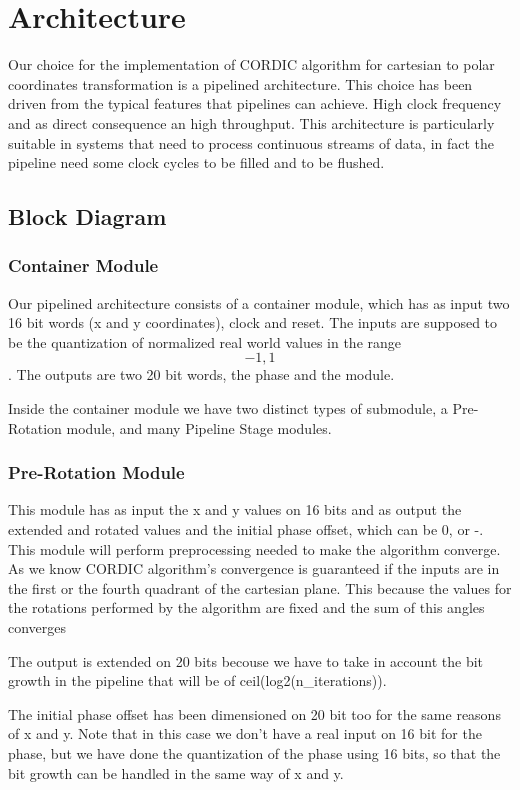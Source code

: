 \section{Architecture}
Our choice for the implementation of CORDIC algorithm for cartesian to polar
coordinates transformation is a pipelined architecture. This choice has been
driven from the typical features that pipelines can achieve. High clock
frequency and as direct consequence an high throughput. This architecture is
particularly suitable in systems that need to process continuous streams of
data, in fact the pipeline need some clock cycles to be filled and to be
flushed.

\subsection{Block Diagram}
\subsubsection{Container Module}
Our pipelined architecture consists of a container module, which has as input
two 16 bit words (x and y coordinates), clock and reset. The inputs are supposed 
to be the quantization of normalized real world values in the range \[-1, 1\]. 
The outputs are two 20 bit words, the phase and the module.

Inside the container module we have two distinct types of submodule, a
Pre-Rotation module, and many Pipeline Stage modules.

\subsubsection{Pre-Rotation Module}
This module has as input the x and y values on 16 bits and as 
output the extended and rotated values and the initial phase offset, which can
be 0, \pi or -\pi. 
This module will perform preprocessing needed to make the algorithm converge. 
As we know CORDIC algorithm's convergence is guaranteed if the inputs are in the 
first or the fourth quadrant of the cartesian plane.
This because the values for the rotations performed by the algorithm are fixed
and the sum of this angles converges

The output is extended on 20 bits becouse we have to take in account the bit
growth in the pipeline that will be of ceil(log2(n_iterations)).

The initial phase offset has been dimensioned on 20 bit too for the same
reasons of x and y. Note that in this case we don't have a real input on 16 bit
for the phase, but we have done the quantization of the phase using 16 bits, so
that the bit growth can be handled in the same way of x and y.

